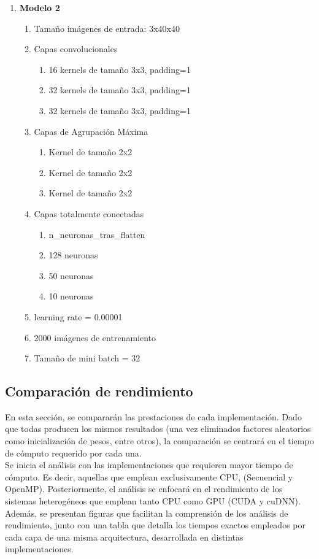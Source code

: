 \begin{enumerate}
	\item \textbf{Modelo 2}
	\begin{enumerate}[label=\textbullet, nosep]
		\item Tamaño imágenes de entrada: 3x40x40
		\item Capas convolucionales
		\begin{enumerate}[label=\textbullet, nosep]
			\item 16 kernels de tamaño 3x3, padding=1
			\item 32 kernels de tamaño 3x3, padding=1
			\item 32 kernels de tamaño 3x3, padding=1
		\end{enumerate}
		\item Capas de Agrupación Máxima
		\begin{enumerate}[label=\textbullet, nosep]
			\item Kernel de tamaño 2x2
			\item Kernel de tamaño 2x2
			\item Kernel de tamaño 2x2
		\end{enumerate}
		\item Capas totalmente conectadas
		\begin{enumerate}[label=\textbullet, nosep]
			\item n\_neuronas\_tras\_flatten
			\item 128 neuronas
			\item 50 neuronas
			\item 10 neuronas
		\end{enumerate}
		\item learning rate = 0.00001
		\item 2000 imágenes de entrenamiento
		\item Tamaño de mini batch = 32
	\end{enumerate}	
\end{enumerate}

\newpage

\subsection{Comparación de rendimiento}

En esta sección, se compararán las prestaciones de cada implementación. Dado que todas producen los mismos resultados (una vez eliminados factores aleatorios como inicialización de pesos, entre otros), la comparación se centrará en el tiempo de cómputo requerido por cada una. \\
Se inicia el análisis con las implementaciones que requieren mayor tiempo de cómputo. Es decir, aquellas que emplean exclusivamente CPU, (Secuencial y OpenMP). Posteriormente, el análisis se enfocará en el rendimiento de los sistemas heterogéneos que emplean tanto CPU como GPU (CUDA y cuDNN). \\
Además, se presentan figuras que facilitan la comprensión  de los análisis de rendimiento, junto con una tabla que detalla los tiempos exactos empleados por cada capa de una misma arquitectura, desarrollada en distintas implementaciones.

